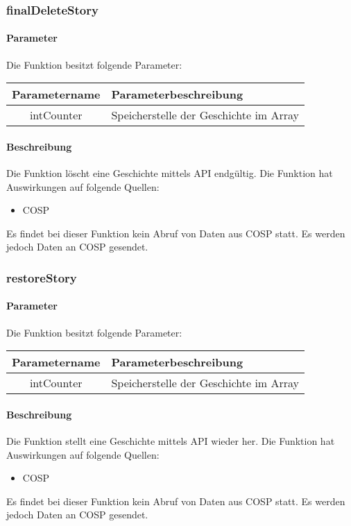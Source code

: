 \subsubsection{finalDeleteStory}
\paragraph{Parameter} Die Funktion besitzt folgende Parameter:
\begin{table}[H]
	\begin{tabular}{|c|p{11cm}|}
		\hline
		\textbf{Parametername} & \textbf{Parameterbeschreibung} \\ \hline
		intCounter & Speicherstelle der Geschichte im Array \\ \hline
	\end{tabular}
\end{table}
\paragraph{Beschreibung} Die Funktion löscht eine Geschichte mittels API endgültig. Die Funktion hat Auswirkungen auf folgende Quellen:
\begin{itemize}
	\item COSP
\end{itemize}
Es findet bei dieser Funktion kein Abruf von Daten aus {\glqq COSP\grqq} statt. Es werden jedoch Daten an {\glqq COSP\grqq} gesendet.
\subsubsection{restoreStory}
\paragraph{Parameter} Die Funktion besitzt folgende Parameter:
\begin{table}[H]
	\begin{tabular}{|c|p{11cm}|}
		\hline
		\textbf{Parametername} & \textbf{Parameterbeschreibung} \\ \hline
		intCounter & Speicherstelle der Geschichte im Array \\ \hline
	\end{tabular}
\end{table}
\paragraph{Beschreibung} Die Funktion stellt eine Geschichte mittels API wieder her. Die Funktion hat Auswirkungen auf folgende Quellen:
\begin{itemize}
	\item COSP
\end{itemize}
Es findet bei dieser Funktion kein Abruf von Daten aus {\glqq COSP\grqq} statt. Es werden jedoch Daten an {\glqq COSP\grqq} gesendet.
